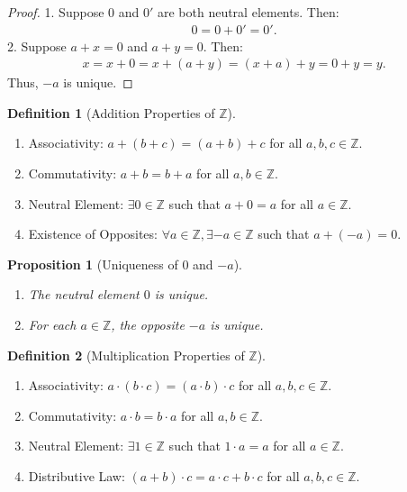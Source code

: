 \documentclass[9pt]{article}
\theoremstyle{definition}
\newtheorem{definition}{Definition}
\theoremstyle{plain}
\newtheorem{proposition}{Proposition}
\begin{document}
\begin{proof}
1. Suppose $ 0 $ and $ 0' $ are both neutral elements. Then:
\begin{align}
0 = 0 + 0' = 0'.
\end{align}
2. Suppose $ a + x = 0 $ and $ a + y = 0 $. Then:
\begin{align}
x = x + 0 = x + (a + y) = (x + a) + y = 0 + y = y.
\end{align}
Thus, $ -a $ is unique.
\end{proof}
\begin{definition}[Addition Properties of $ \mathbb{Z} $]
\begin{enumerate}[label=(A\arabic*)]
    \item {Associativity:} $ a + (b + c) = (a + b) + c $ for all $ a, b, c \in \mathbb{Z} $.
    \item {Commutativity:} $ a + b = b + a $ for all $ a, b \in \mathbb{Z} $.
    \item {Neutral Element:} $ \exists 0 \in \mathbb{Z} $ such that $ a + 0 = a $ for all $ a \in \mathbb{Z} $.
    \item {Existence of Opposites:} $ \forall a \in \mathbb{Z}, \exists -a \in \mathbb{Z} $ such that $ a + (-a) = 0 $.
\end{enumerate}
\end{definition}

\begin{proposition}[Uniqueness of $ 0 $ and $ -a $]
\begin{enumerate}
    \item The neutral element $ 0 $ is unique.
    \item For each $ a \in \mathbb{Z} $, the opposite $ -a $ is unique.
\end{enumerate}
\end{proposition}

\begin{definition}[Multiplication Properties of $ \mathbb{Z} $]

\begin{enumerate}[label=(M\arabic*)]
    \item {Associativity:} $ a \cdot (b \cdot c) = (a \cdot b) \cdot c $ for all $ a, b, c \in \mathbb{Z} $.
    \item {Commutativity:} $ a \cdot b = b \cdot a $ for all $ a, b \in \mathbb{Z} $.
    \item {Neutral Element:} $ \exists 1 \in \mathbb{Z} $ such that $ 1 \cdot a = a $ for all $ a \in \mathbb{Z} $.
    \item {Distributive Law:} $ (a + b) \cdot c = a \cdot c + b \cdot c $ for all $ a, b, c \in \mathbb{Z} $.
\end{enumerate}
\end{definition}
\end{document}
